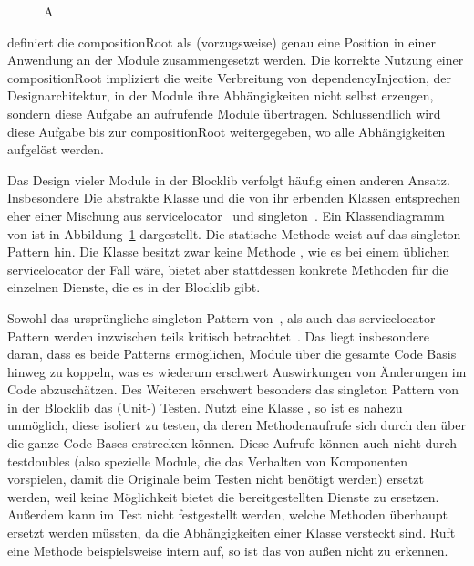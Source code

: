 \begin{figure}
  \begin{center}
    
  \end{center}
  \caption{A}\label{fig:diagContext}
\end{figure}
\textcite[S.~76]{Seemann2012} definiert die \gls{compositionRoot} als (vorzugsweise) genau eine Position in einer Anwendung an der Module zusammengesetzt werden. Die korrekte Nutzung einer \gls{compositionRoot} impliziert die weite Verbreitung von \gls{dependencyInjection}, der Designarchitektur, in der Module ihre Abhängigkeiten nicht selbst erzeugen, sondern diese Aufgabe an aufrufende Module übertragen. Schlussendlich wird diese Aufgabe bis zur \gls{compositionRoot} weitergegeben, wo alle Abhängigkeiten aufgelöst werden. 


Das Design vieler Module in der Blocklib verfolgt häufig einen anderen Ansatz. Insbesondere Die abstrakte Klasse  und die von ihr erbenden Klassen entsprechen eher einer Mischung aus \gls{servicelocator}~\cite[S.~301~ff.]{Nystrom2015} und \gls{singleton}~\cite[S.~103~ff.]{Nystrom2015}. Ein Klassendiagramm von  ist in Abbildung~\ref{fig:diagContext} dargestellt. Die statische Methode  weist auf das \gls{singleton} Pattern hin. Die Klasse besitzt zwar keine Methode , wie es bei einem üblichen \gls{servicelocator} der Fall wäre, bietet aber stattdessen konkrete Methoden für die einzelnen Dienste, die es in der Blocklib gibt.

Sowohl das ursprüngliche \gls{singleton} Pattern von~\textcite[S.~127~ff.]{Gamma2016}, als auch das \gls{servicelocator} Pattern werden inzwischen teils kritisch betrachtet~\cite[S.~103~ff.]{Nystrom2015}\cite[S.~154~ff.]{Seemann2012}. Das liegt insbesondere daran, dass es beide Patterns ermöglichen, Module über die gesamte Code Basis hinweg zu koppeln, was es wiederum erschwert Auswirkungen von Änderungen im Code abzuschätzen. Des Weiteren erschwert besonders das \gls{singleton} Pattern von  in der Blocklib das (Unit-) Testen. Nutzt eine Klasse , so ist es nahezu unmöglich, diese isoliert zu testen, da deren Methodenaufrufe sich durch den  über die ganze Code Bases erstrecken können. Diese  Aufrufe können auch nicht durch \glspl{testdouble} (also spezielle Module, die das Verhalten von Komponenten vorspielen, damit die Originale beim Testen nicht benötigt werden) ersetzt werden, weil  keine Möglichkeit bietet die bereitgestellten Dienste zu ersetzen. Außerdem kann im Test nicht festgestellt werden, welche Methoden überhaupt ersetzt werden müssten, da die Abhängigkeiten einer Klasse versteckt sind. Ruft eine Methode beispielsweise intern  auf, so ist das von außen nicht zu erkennen.

